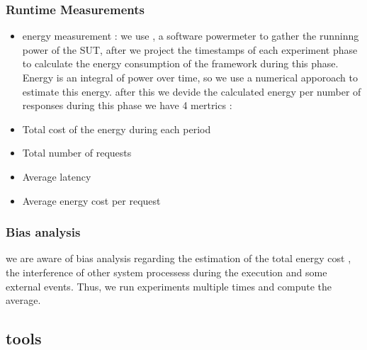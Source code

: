 \subsubsection{Runtime Measurements}
\begin{itemize}
    \item energy measurement :
          we use , a software powermeter  to gather the runninng power of the SUT, after we project the timestamps of each experiment phase to calculate the energy consumption of the framework during this phase.
          Energy is an integral of power over time, so we use a numerical apporoach to estimate this energy. 
          after this we devide the calculated energy per number of responses
          during this phase
          we have 4 mertrics :

    \item Total cost of the energy during each period
    \item Total number of requests
    \item Average latency
    \item Average energy cost per request
\end{itemize}


\subsubsection{Bias analysis}
we are aware of bias analysis regarding the estimation of the total energy cost , the interference of other system processess during the execution and some external events. Thus, we run experiments multiple times and compute the average.

\subsection{tools }
